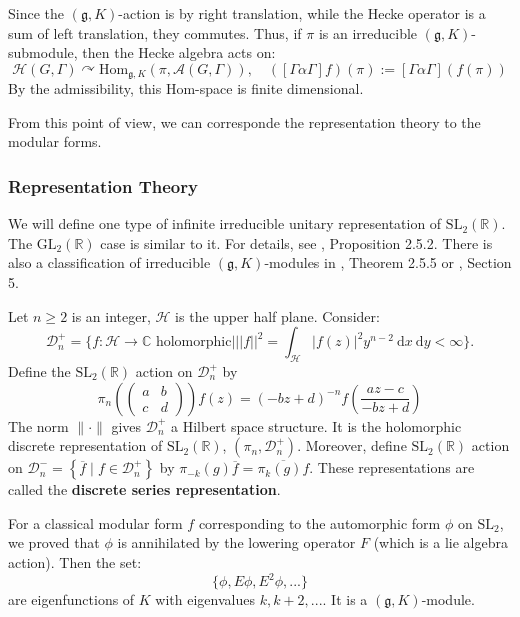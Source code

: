 \documentclass[11pt,english]{smfart}
\theoremstyle{definition}
\theoremstyle{remark}
\renewcommand{\bar}{\overline}
\begin{document}
Since the $ (\mathfrak{g}, K) $-action is by right translation, while the Hecke operator is a sum of left translation, they commutes.
Thus, if $\pi$ is an irreducible $ (\mathfrak{g}, K) $-submodule, then the Hecke algebra acts on:
\[\mathcal{H}(G,\Gamma) \curvearrowright \mathrm{Hom}_{\mathfrak{g}, K}(\pi,\mathcal{A}(G,\Gamma) ),\quad ([\Gamma \alpha \Gamma]f)(\pi):=[\Gamma \alpha \Gamma](f(\pi)) \]
By the admissibility, this $\mathrm{Hom}$-space is finite dimensional.

From this point of view, we can corresponde the representation theory to the modular forms.
\subsubsection{Representation Theory}
We will define one type of infinite irreducible unitary representation of $\mathrm{SL}_2(\mathbb{R})$. The $\mathrm{GL}_2(\mathbb{R})$ case is similar to it.
For details, see \cite{Bum97}, Proposition 2.5.2. There is also a classification of irreducible
$(\mathfrak{g},K)$-modules in \cite{Bum97}, Theorem 2.5.5 or \cite{JL70}, Section 5.

Let $n \geq 2$ is an integer, $ \mathcal{H}  $ is the upper half plane. Consider:
\[\mathscr{D}_{n}^{+}=\biggl\{f: \mathcal{H} \rightarrow \mathbb{C} \text { holomorphic}\bigg| ||f||^{2}=\int_{\mathcal{H}} |f(z)|^{2} y^{n-2} \mathrm{~d} x \mathrm{~d} y<\infty \biggr\}.\]
Define the $\mathrm{SL_2}(\mathbb{R})$ action on $\mathscr{D}_{n}^{+}$ by
\[\pi_n \left(\left(\begin{array}{ll}
    a & b \\
    c & d
    \end{array}\right)\right) f(z)=(-b z+d)^{-n} f\left(\frac{a z-c}{-b z+d}\right)\]
The norm $ \|\cdot\| $ gives  $\mathscr{D}_{n}^{+} $ a Hilbert space structure. It is the holomorphic discrete representation of $\mathrm{SL}_2(\mathbb{R})$, $(\pi _n,\mathscr{D}_{n}^{+})$.
Moreover, define $\mathrm{SL}_2(\mathbb{R})$ action on $\mathscr{D}_{n}^{-}=\left\{\bar{f} \mid f \in \mathscr{D}_{n}^{+}\right\} $ by $\pi_{-k}(g) \bar{f}=\overline{\pi_k(g) f} $.
These representations are called the \textbf{discrete series representation}.

For a classical modular form $f$ corresponding to the automorphic form $\phi$ on $\mathrm{SL_2}$, we proved that $\phi$ is annihilated by the lowering operator $F$ (which is a lie algebra action).
Then the set:
\[\{ \phi, E\phi, E^{2}\phi,...\}\]
are eigenfunctions of $K$ with eigenvalues $k,k+2,...$. It is a $ (\mathfrak{g}, K) $-module.
\end{document}
